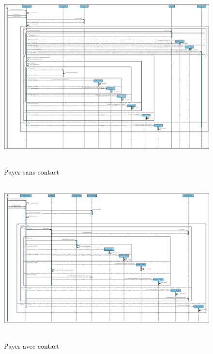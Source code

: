 \documentclass[]{report}
\begin{document}


\newpage

\begin{figure}[h!]
\hbox{
    \centering\includegraphics[width=\linewidth]{img/Sequence 4 - Extension 6.pdf}
}
\caption{Payer sans contact}
\end{figure}



\newpage

\begin{figure}[h!]
\hbox{
    \centering\includegraphics[width=\linewidth]{img/Sequence 5 - Extension 6.pdf}
}
\caption{Payer avec contact}
\end{figure}



\newpage
\end{document}
